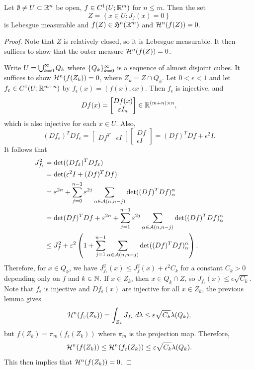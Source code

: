 \documentclass[a4paper]{article}
\begin{document}
\begin{thm}
Let $\emptyset \neq U \subset \mathbb{R}^n$ be open, $f \in C^1 (U;
\mathbb{R}^m)$ for $n \leq m$. Then the set
\[
Z = \left\{ x \in U: J_f(x) = 0 \right\}
\]
is Lebesgue measurable and $f(Z) \in \mathfrak{H}^n(\mathbb{R}^m)$ and
$\mathcal{H}^n (f(Z)) = 0$.
\end{thm}

\begin{proof}
Note that $Z$ is relatively closed, so it is Lebesgue
measurable. It then suffices to show that the outer
measure $\mathcal{H}^n (f(Z)) = 0$.

Write $U = \bigcup_{k=0}^\infty Q_k$ where $\{ Q_k \}_{k=0}^\infty$ is
a sequence of almost disjoint cubes. It suffices to show
$\mathcal{H}^n (f(Z_k)) = 0$, where $Z_k = Z \cap Q_k$.
Let $0 < \epsilon < 1$ and let $f_\varepsilon \in C^1 (U;
\mathbb{R}^{m+n})$ by $f_\epsilon(x) = (f(x), \epsilon x)$.
Then $f_\epsilon$ is injective, and
\[
Df(x) = \begin{bmatrix}
  Df(x) \\
  \varepsilon I_n
\end{bmatrix}
\in \mathbb{R}^{(m + n) \times n},
\]
which is also injective for each $x \in U$. Also,
\[
(Df_\epsilon)^T Df_\epsilon =
\begin{bmatrix}
  Df^T & \epsilon I
\end{bmatrix}
\begin{bmatrix}
  Df \\
  \epsilon I
\end{bmatrix}
= (Df)^T Df + \epsilon^2 I.
\]
It follows that
\[
\begin{aligned}
  J_{f_\varepsilon}^2
  &= \det((Df_\varepsilon)^T Df_\varepsilon) \\
  &= \det(\varepsilon^2 I + (Df)^T Df) \\
  &= \varepsilon^{2n} + \sum_{j=0}^{n-1} \varepsilon^{2j}
  \sum_{\alpha \in \mathcal{A}(n, n - j)} \det((Df)^T Df)_\alpha^\alpha \\
  &= \det (Df)^T Df + \varepsilon^{2n}
  + \sum_{j=1}^{n-1} \varepsilon^{2j} \sum_{\alpha \in \mathcal{A}(n, n-j)}
  \det((Df)^T Df)_\alpha^\alpha \\
  &\leq J_f^2 + \varepsilon^2 \left( 1 +
  \sum_{j=1}^{n-1} \sum_{\alpha \in \mathcal{A}(n, n-j)}
  \det((Df)^T Df)_\alpha^\alpha \right).
\end{aligned}
\]
Therefore, for $x \in Q_k$, we have $J_{f_\epsilon}^2 (x)
\leq J_f^2(x) + \epsilon^2 C_k$ for a constant
$C_k > 0$ depending only on $f$ and $k \in \mathbb{N}$.
If $x \in Z_k$, then $x \in Q_k \cap Z$, so
$J_{f_\epsilon} (x) \leq \epsilon \sqrt{C_k}$.
Note that $f_\epsilon$ is injective and
$Df_\epsilon(x)$ are injective for all $x \in Z_k$,
the previous lemma gives
\[
\mathcal{H}^n (f_\varepsilon(Z_k))
= \int_{Z_k} J_{f_\varepsilon} \; d \lambda
\leq \varepsilon \sqrt{C_k} \lambda(Q_k),
\]
but $f(Z_k) = \pi_{m} (f_\epsilon (Z_k))$ where
$\pi_m$ is the projection map. Therefore,
\[
\mathcal{H}^n (f(Z_k)) \leq \mathcal{H}^n (f_\varepsilon (Z_k))
\leq \varepsilon \sqrt{C_k} \lambda (Q_k).
\]
This then implies that $\mathcal{H}^n(f(Z_k)) = 0$.
\end{proof}
\end{document}
